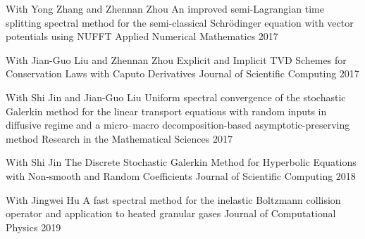 



\begin{cvhonors}

  \cvhonor
    {With Yong Zhang and Zhennan Zhou} %
    {An improved semi-Lagrangian time splitting spectral method for the semi-classical Schrödinger equation with vector potentials using NUFFT} %
    {Applied Numerical Mathematics} %
    {2017} %

  \cvhonor
    {With Jian-Guo Liu and Zhennan Zhou} %
    {Explicit and Implicit TVD Schemes for Conservation Laws with Caputo Derivatives} %
    {Journal of Scientific Computing} %
    {2017} %

  \cvhonor
    {With Shi Jin and Jian-Guo Liu} %
    {Uniform spectral convergence of the stochastic Galerkin method for the linear transport equations with random inputs in diffusive regime and a micro--macro decomposition-based asymptotic-preserving method} %
    {Research in the Mathematical Sciences} %
    {2017} %

  \cvhonor
    {With Shi Jin} %
    {The Discrete Stochastic Galerkin Method for Hyperbolic Equations with Non-smooth and Random Coefficients} %
    {Journal of Scientific Computing} %
    {2018} %

  \cvhonor
    {With Jingwei Hu} %
    {A fast spectral method for the inelastic Boltzmann collision operator and application to heated granular gases} %
    {Journal of Computational Physics} %
    {2019} %

\end{cvhonors}


